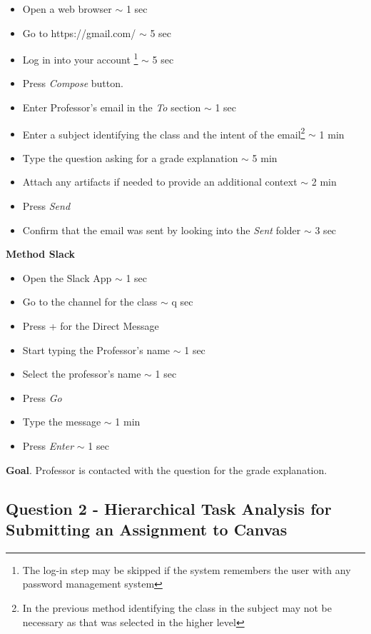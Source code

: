 \documentclass[12pt,letterpaper]{article}
\begin{document}
\begin{itemize}
    \itemsep-0.2em 
    \item Open a web browser  $\sim$ 1 sec
    \item Go to https://gmail.com/ $\sim$ 5 sec 
    \item Log in into your account \footnote{The log-in step may be skipped if the system remembers the user with any password management system} $\sim$ 5 sec 
    \item Press \textit{Compose} button. 
    \item Enter Professor's email in the \textit{To} section $\sim$ 1 sec
    \item Enter a subject identifying the class and the intent of the email\footnote{In the previous method identifying the class in the subject may not be necessary as that was selected in the higher level} $\sim$ 1 min
    \item Type the question asking for a grade explanation $\sim$ 5 min
    \item Attach any artifacts if needed to provide an additional context $\sim$ 2 min
    \item Press \textit{Send}
    \item Confirm that the email was sent by looking into the \textit{Sent} folder $\sim$ 3 sec
\end{itemize}

\textbf{Method Slack}

\begin{itemize}
    \itemsep-0.2em 
    \item Open the Slack App  $\sim$ 1 sec
    \item Go to the channel for the class $\sim$ q sec 
    \item Press + for the Direct Message
    \item Start typing the Professor's name $\sim$ 1 sec
    \item Select the professor's name $\sim$ 1 sec
    \item Press \textit{Go}
    \item Type the message $\sim$ 1 min
    \item Press \textit{Enter} $\sim$ 1 sec
\end{itemize}

\textbf{Goal}. Professor is contacted with the question for the grade explanation.

\subsection*{Question 2 - Hierarchical Task Analysis for Submitting an Assignment to Canvas}
\end{document}
